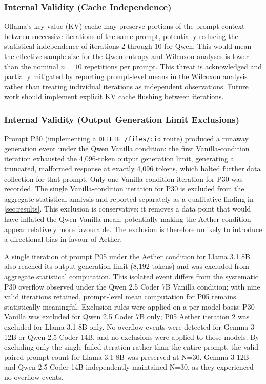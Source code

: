 \documentclass[review,12pt,3p]{elsarticle}
\begin{document}
\subsubsection{Internal Validity (Cache Independence)}

Ollama's key-value (KV) cache may preserve portions of the prompt context between successive
iterations of the same prompt, potentially reducing the statistical independence of
iterations 2 through 10 for Qwen. This would mean the effective sample size for the
Qwen entropy and Wilcoxon analyses is lower than the nominal $n = 10$ repetitions per
prompt. This threat is acknowledged and partially mitigated by reporting prompt-level
means in the Wilcoxon analysis rather than treating individual iterations as independent
observations. Future work should implement explicit KV cache flushing between iterations.

\subsubsection{Internal Validity (Output Generation Limit Exclusions)}

Prompt P30 (implementing a \texttt{DELETE /files/:id} route) produced a runaway generation event
under the Qwen Vanilla condition: the first Vanilla-condition iteration exhausted the
4,096-token output generation limit, generating a truncated, malformed response at exactly 4,096
tokens, which halted further data collection for that prompt. Only one Vanilla-condition
iteration for P30 was recorded. The single Vanilla-condition iteration for P30 is excluded
from the aggregate statistical analysis and reported separately as a qualitative finding
in \cref{sec:results}. This exclusion is conservative: it removes a data point that would
have inflated the Qwen Vanilla mean, potentially making the Aether condition appear
relatively more favourable. The exclusion is therefore unlikely to introduce a directional
bias in favour of Aether.

A single iteration of prompt P05 under the Aether condition for Llama 3.1 8B also reached its output generation limit (8,192 tokens) and was excluded from aggregate statistical
computation. This isolated event differs from the systematic P30 overflow observed under the
Qwen 2.5 Coder 7B Vanilla condition; with nine valid iterations retained, prompt-level mean
computation for P05 remains statistically meaningful. Exclusion rules were applied on a per-model basis: P30 Vanilla was excluded for Qwen 2.5 Coder 7B only; P05 Aether
iteration 2 was excluded for Llama 3.1 8B only. No overflow events were detected for Gemma
3 12B or Qwen 2.5 Coder 14B, and no exclusions were applied to those models. By excluding only 
the single failed iteration rather than the entire prompt, the valid paired prompt count for 
Llama 3.1 8B was preserved at N=30. Gemma 3 12B and Qwen 2.5 
Coder 14B independently maintained N=30, as they experienced no overflow events.
\end{document}
